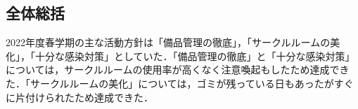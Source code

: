 \subsection*{全体総括}


2022年度春学期の主な活動方針は「備品管理の徹底」，「サークルルームの美化」，「十分な感染対策」としていた．「備品管理の徹底」と「十分な感染対策」については，サークルルームの使用率が高くなく注意喚起もしたため達成できた．「サークルルームの美化」については，ゴミが残っている日もあったがすぐに片付けられたため達成できた．
